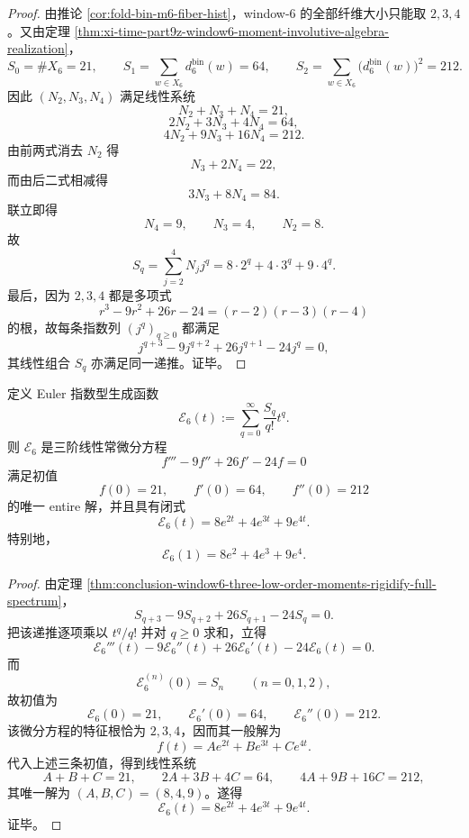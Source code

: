 \begin{proof}
由推论 \ref{cor:fold-bin-m6-fiber-hist}，window-\(6\) 的全部纤维大小只能取 \(2,3,4\)。又由定理 \ref{thm:xi-time-part9z-window6-moment-involutive-algebra-realization}，
\[
S_0=\#X_6=21,
\qquad
S_1=\sum_{w\in X_6}d_6^{\mathrm{bin}}(w)=64,
\qquad
S_2=\sum_{w\in X_6}\bigl(d_6^{\mathrm{bin}}(w)\bigr)^2=212.
\]
因此 \((N_2,N_3,N_4)\) 满足线性系统
\[
N_2+N_3+N_4=21,
\]
\[
2N_2+3N_3+4N_4=64,
\]
\[
4N_2+9N_3+16N_4=212.
\]
由前两式消去 \(N_2\) 得
\[
N_3+2N_4=22,
\]
而由后二式相减得
\[
3N_3+8N_4=84.
\]
联立即得
\[
N_4=9,\qquad N_3=4,\qquad N_2=8.
\]
故
\[
S_q=\sum_{j=2}^4 N_j j^q=8\cdot 2^q+4\cdot 3^q+9\cdot 4^q.
\]
最后，因为 \(2,3,4\) 都是多项式
\[
r^3-9r^2+26r-24=(r-2)(r-3)(r-4)
\]
的根，故每条指数列 \((j^q)_{q\ge 0}\) 都满足
\[
j^{q+3}-9j^{q+2}+26j^{q+1}-24j^q=0,
\]
其线性组合 \(S_q\) 亦满足同一递推。证毕。
\end{proof}

\begin{corollary}\label{cor:conclusion-window6-euler-egf-ode-closure}
定义 Euler 指数型生成函数
\[
\mathcal E_6(t):=\sum_{q=0}^{\infty}\frac{S_q}{q!}t^q.
\]
则 \(\mathcal E_6\) 是三阶线性常微分方程
\[
f'''-9f''+26f'-24f=0
\]
满足初值
\[
f(0)=21,\qquad f'(0)=64,\qquad f''(0)=212
\]
的唯一 entire 解，并且具有闭式
\[
\mathcal E_6(t)=8e^{2t}+4e^{3t}+9e^{4t}.
\]
特别地，
\[
\mathcal E_6(1)=8e^2+4e^3+9e^4.
\]
\end{corollary}

\begin{proof}
由定理 \ref{thm:conclusion-window6-three-low-order-moments-rigidify-full-spectrum}，
\[
S_{q+3}-9S_{q+2}+26S_{q+1}-24S_q=0.
\]
把该递推逐项乘以 \(t^q/q!\) 并对 \(q\ge 0\) 求和，立得
\[
\mathcal E_6'''(t)-9\mathcal E_6''(t)+26\mathcal E_6'(t)-24\mathcal E_6(t)=0.
\]
而
\[
\mathcal E_6^{(n)}(0)=S_n
\qquad (n=0,1,2),
\]
故初值为
\[
\mathcal E_6(0)=21,\qquad
\mathcal E_6'(0)=64,\qquad
\mathcal E_6''(0)=212.
\]
该微分方程的特征根恰为 \(2,3,4\)，因而其一般解为
\[
f(t)=Ae^{2t}+Be^{3t}+Ce^{4t}.
\]
代入上述三条初值，得到线性系统
\[
A+B+C=21,\qquad 2A+3B+4C=64,\qquad 4A+9B+16C=212,
\]
其唯一解为 \((A,B,C)=(8,4,9)\)。遂得
\[
\mathcal E_6(t)=8e^{2t}+4e^{3t}+9e^{4t}.
\]
证毕。
\end{proof}

